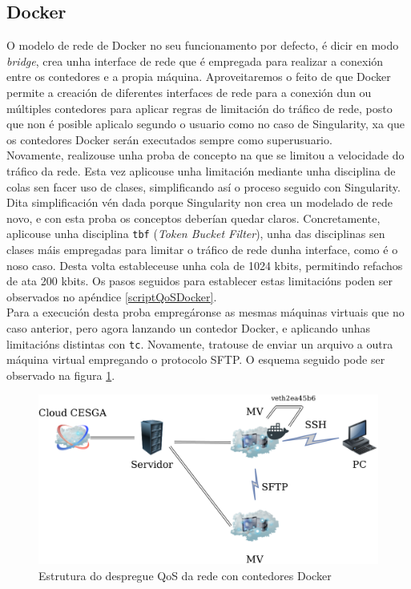\subsection{Docker}

O modelo de rede de Docker no seu funcionamento por defecto, é dicir en modo \textit{bridge}, crea unha interface de rede que é empregada para realizar a conexión entre os contedores e a propia máquina. Aproveitaremos o feito de que Docker permite a creación de diferentes interfaces de rede para a conexión dun ou múltiples contedores para aplicar regras de limitación do tráfico de rede, posto que non é posible aplicalo segundo o usuario como no caso de Singularity, xa que os contedores Docker serán executados sempre como superusuario.\\

Novamente, realizouse unha proba de concepto na que se limitou a velocidade do tráfico da rede. Esta vez aplicouse unha limitación mediante unha disciplina de colas sen facer uso de clases, simplificando así o proceso seguido con Singularity. Dita simplificación vén dada porque Singularity non crea un modelado de rede novo, e con esta proba os conceptos deberían quedar claros. Concretamente, aplicouse unha disciplina {\tt tbf} (\textit{Token Bucket Filter}), unha das disciplinas sen clases máis empregadas para limitar o tráfico de rede dunha interface, como é o noso caso. Desta volta estableceuse unha cola de 1024 kbits, permitindo refachos de ata 200 kbits. Os pasos seguidos para establecer estas limitacións poden ser observados no apéndice \ref{scriptQoSDocker}.\\

Para a execución desta proba empregáronse as mesmas máquinas virtuais que no caso anterior, pero agora lanzando un contedor Docker, e aplicando unhas limitacións distintas con {\tt tc}. Novamente, tratouse de enviar un arquivo a outra máquina virtual empregando o protocolo SFTP. O esquema seguido pode ser observado na figura \ref{DiagramaQoSRedeDocker}.\\

\begin{figure}
\centerline{\includegraphics[width=15cm]{figuras/DiagramaQoSRedeDocker.png}}
\caption{Estrutura do despregue QoS da rede con contedores Docker}
\label{DiagramaQoSRedeDocker}
\end{figure}

